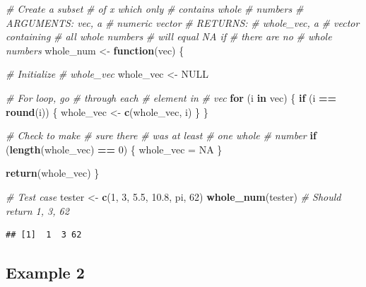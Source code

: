 \documentclass[
]{book}
\newenvironment{Shaded}{\begin{snugshade}}{\end{snugshade}}
\newcommand{\CommentTok}[1]{\textcolor[rgb]{0.56,0.35,0.01}{\textit{#1}}}
\newcommand{\ControlFlowTok}[1]{\textcolor[rgb]{0.13,0.29,0.53}{\textbf{#1}}}
\newcommand{\DecValTok}[1]{\textcolor[rgb]{0.00,0.00,0.81}{#1}}
\newcommand{\FloatTok}[1]{\textcolor[rgb]{0.00,0.00,0.81}{#1}}
\newcommand{\KeywordTok}[1]{\textcolor[rgb]{0.13,0.29,0.53}{\textbf{#1}}}
\newcommand{\NormalTok}[1]{#1}
\newcommand{\OperatorTok}[1]{\textcolor[rgb]{0.81,0.36,0.00}{\textbf{#1}}}
\newcommand{\OtherTok}[1]{\textcolor[rgb]{0.56,0.35,0.01}{#1}}
\newcommand{\StringTok}[1]{\textcolor[rgb]{0.31,0.60,0.02}{#1}}
\begin{document}
\begin{Shaded}
\begin{Highlighting}[]
\CommentTok{# Create a subset}
\CommentTok{# of x which only}
\CommentTok{# contains whole}
\CommentTok{# numbers}
\CommentTok{# ARGUMENTS: vec, a}
\CommentTok{# numeric vector}
\CommentTok{# RETURNS:}
\CommentTok{# whole_vec, a}
\CommentTok{# vector containing}
\CommentTok{# all whole numbers}
\CommentTok{# will equal NA if}
\CommentTok{# there are no}
\CommentTok{# whole numbers}
\NormalTok{whole_num <-}\StringTok{ }\ControlFlowTok{function}\NormalTok{(vec) \{}

    \CommentTok{# Initialize}
    \CommentTok{# whole_vec}
\NormalTok{    whole_vec <-}\StringTok{ }\OtherTok{NULL}

    \CommentTok{# For loop, go}
    \CommentTok{# through each}
    \CommentTok{# element in}
    \CommentTok{# vec}
    \ControlFlowTok{for}\NormalTok{ (i }\ControlFlowTok{in}\NormalTok{ vec) \{}
        \ControlFlowTok{if}\NormalTok{ (i }\OperatorTok{==}\StringTok{ }\KeywordTok{round}\NormalTok{(i)) \{}
\NormalTok{            whole_vec <-}\StringTok{ }\KeywordTok{c}\NormalTok{(whole_vec,}
\NormalTok{                i)}
\NormalTok{        \}}
\NormalTok{    \}}

    \CommentTok{# Check to make}
    \CommentTok{# sure there}
    \CommentTok{# was at least}
    \CommentTok{# one whole}
    \CommentTok{# number}
    \ControlFlowTok{if}\NormalTok{ (}\KeywordTok{length}\NormalTok{(whole_vec) }\OperatorTok{==}
\StringTok{        }\DecValTok{0}\NormalTok{) \{}
\NormalTok{        whole_vec =}\StringTok{ }\OtherTok{NA}
\NormalTok{    \}}

    \KeywordTok{return}\NormalTok{(whole_vec)}
\NormalTok{\}}


\CommentTok{# Test case}
\NormalTok{tester <-}\StringTok{ }\KeywordTok{c}\NormalTok{(}\DecValTok{1}\NormalTok{, }\DecValTok{3}\NormalTok{, }\FloatTok{5.5}\NormalTok{,}
    \FloatTok{10.8}\NormalTok{, pi, }\DecValTok{62}\NormalTok{)}
\KeywordTok{whole_num}\NormalTok{(tester)  }\CommentTok{# Should return 1, 3, 62}
\end{Highlighting}
\end{Shaded}

\begin{verbatim}
## [1]  1  3 62
\end{verbatim}

\hypertarget{example-2}{%
\subsection{Example 2}\label{example-2}}
\end{document}
